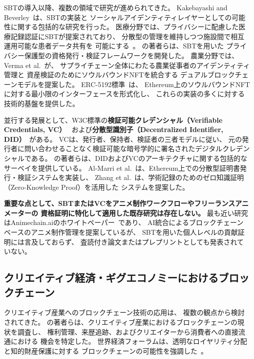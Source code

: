 SBTの導入以降、複数の領域で研究が進められてきた。
Kakebayashi and Beverley~\cite{kakebayashi2023sbt}は、SBTの実装と
ソーシャルアイデンティティレイヤーとしての可能性に関する包括的な研究を行った。
医療分野では、プライバシーに配慮した医療記録認証にSBTが提案されており、
分散型の管理を維持しつつ施設間で相互運用可能な患者データ共有を
可能にする~\cite{sbt_health2024}。
\cite{sbt_credential_framework2023}の著者らは、SBTを用いた
プライバシー保護型の資格発行・検証フレームワークを開発した。
農業分野では、Verma et al.~\cite{verma2025sbt_agriculture}が、
サプライチェーン全体にわたる農業従事者のアイデンティティ管理と
資産検証のためにソウルバウンドNFTを統合する
デュアルブロックチェーンモデルを提案した。
ERC-5192標準~\cite{daubenschuetz2022erc5192}は、
Ethereum上のソウルバウンドNFTに対する最小限のインターフェースを形式化し、
これらの実装の多くに対する技術的基盤を提供した。

並行する発展として、W3C標準の\textbf{検証可能クレデンシャル（Verifiable Credentials, VC）}~\cite{sporny2022vc}
および\textbf{分散型識別子（Decentralized Identifier, DID）}~\cite{sporny2022did}がある。
VCは、発行者、保持者、検証者の三者モデルに従い、
元の発行者に問い合わせることなく検証可能な暗号学的に署名されたデジタルクレデンシャルである。
\cite{did_survey2024}の著者らは、DIDおよびVCのアーキテクチャに関する包括的なサーベイを提供している。
Al-Marri et al.~\cite{almarri2025decentralized}は、Ethereum上での分散型証明書発行・検証システムを実装し、
Zhang et al.~\cite{zhang2025zkbar}は、学術記録のためのゼロ知識証明（Zero-Knowledge Proof）を活用した
システムを提案した。

\textbf{重要な点として、SBTまたはVCをアニメ制作ワークフローやフリーランスアニメーターの
資格証明に特化して適用した既存研究は存在しない。}
最も近い研究はAnimechain.aiのホワイトペーパー~\cite{animechain2024whitepaper}であり、
AI統合によるブロックチェーンベースのアニメ制作管理を提案しているが、
SBTを用いた個人レベルの貢献証明には言及しておらず、
査読付き論文またはプレプリントとしても発表されていない。

\subsection{クリエイティブ経済・ギグエコノミーにおけるブロックチェーン}
\label{subsec:blockchain_creative}

クリエイティブ産業へのブロックチェーン技術の応用は、
複数の観点から検討されてきた。
\cite{blockchain_creative2023}の著者らは、クリエイティブ産業におけるブロックチェーンの現状を調査し、
権利管理、来歴追跡、およびクリエイターから消費者への直接流通における
機会を特定した。
世界経済フォーラムは、透明なロイヤリティ分配と知的財産保護に対する
ブロックチェーンの可能性を強調した~\cite{wef2017creative}。

